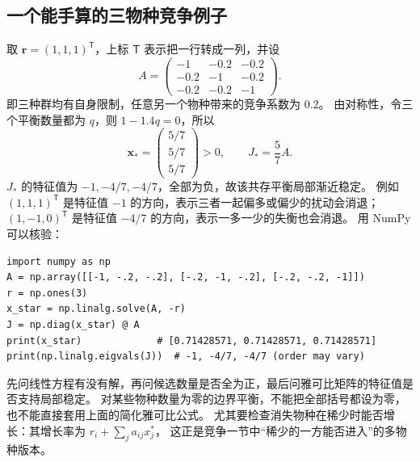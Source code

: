 \documentclass[UTF8,11pt,fontset=none]{ctexart}
\begin{document}
\subsection{一个能手算的三物种竞争例子}
取 $\mathbf r=(1,1,1)^{\mathsf T}$，上标 $\mathsf T$ 表示把一行转成一列，并设
\[
A=\begin{pmatrix}
-1&-0.2&-0.2\\
-0.2&-1&-0.2\\
-0.2&-0.2&-1
\end{pmatrix}.
\]
即三种群均有自身限制，任意另一个物种带来的竞争系数为 $0.2$。
由对称性，令三个平衡数量都为 $q$，则 $1-1.4q=0$，所以
\[
\mathbf x_*=\begin{pmatrix}5/7\\5/7\\5/7\end{pmatrix}>0,\qquad J_*=\frac57 A.
\]
$J_*$ 的特征值为 $-1,-4/7,-4/7$，全部为负，故该共存平衡局部渐近稳定。
例如 $(1,1,1)^{\mathsf T}$ 是特征值 $-1$ 的方向，表示三者一起偏多或偏少的扰动会消退；
$(1,-1,0)^{\mathsf T}$ 是特征值 $-4/7$ 的方向，表示一多一少的失衡也会消退。
用 NumPy 可以核验：
\begin{lstlisting}
import numpy as np
A = np.array([[-1, -.2, -.2], [-.2, -1, -.2], [-.2, -.2, -1]])
r = np.ones(3)
x_star = np.linalg.solve(A, -r)
J = np.diag(x_star) @ A
print(x_star)             # [0.71428571, 0.71428571, 0.71428571]
print(np.linalg.eigvals(J))  # -1, -4/7, -4/7 (order may vary)
\end{lstlisting}

\begin{keybox}
先问线性方程有没有解，再问候选数量是否全为正，最后问雅可比矩阵的特征值是否支持局部稳定。
对某些物种数量为零的边界平衡，不能把全部括号都设为零，也不能直接套用上面的简化雅可比公式。
尤其要检查消失物种在稀少时能否增长：其增长率为 $r_i+\sum_j a_{ij}x_j^*$，
这正是竞争一节中“稀少的一方能否进入”的多物种版本。
\end{keybox}
\end{document}
